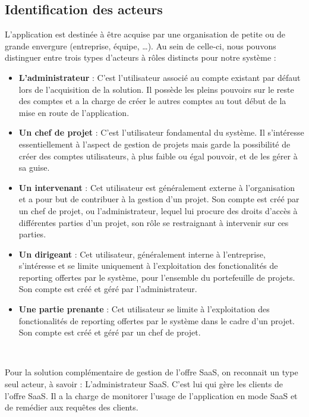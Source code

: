 \begin{spacing}{1.5}
\subsection{Identification des acteurs}
L’application est destinée à être acquise par une organisation de petite ou de grande envergure (entreprise, équipe, …). Au sein de celle-ci, nous pouvons distinguer entre trois types d'acteurs à rôles distincts pour notre système :
\begin{itemize}
    \item \textbf{L'administrateur} : C’est l'utilisateur associé au compte existant par défaut lors de l'acquisition de la solution. Il possède les pleins pouvoirs sur le reste des comptes et a la charge de créer le autres comptes au tout début de la mise en route de l'application.
    \item \textbf{Un chef de projet} : C’est l'utilisateur fondamental du système. Il s'intéresse essentiellement à l'aspect de gestion de projets mais garde la possibilité de créer des comptes utilisateurs, à plus faible ou égal pouvoir, et de les gérer à sa guise.
    \item \textbf{Un intervenant} : Cet utilisateur est généralement externe à l'organisation et a pour but de contribuer à la gestion d'un projet. Son compte est créé par un chef de projet, ou l'administrateur, lequel lui procure des droits d'accès à différentes parties d'un projet, son rôle se restraignant à intervenir sur ces parties.
    \item \textbf{Un dirigeant} : Cet utilisateur, généralement interne à l'entreprise, s'intéresse et se limite uniquement à l'exploitation des fonctionalités de reporting offertes par le système, pour l'ensemble du portefeuille de projets. Son compte est créé et géré par l'administrateur.
    \item \textbf{Une partie prenante} : Cet utilisateur se limite à l'exploitation des fonctionalités de reporting offertes par le système dans le cadre d'un projet. Son compte est créé et géré par un chef de projet.
\end{itemize}
\

Pour la solution complémentaire de gestion de l’offre SaaS, on reconnait un type seul acteur, à savoir : L'administrateur SaaS. C’est lui qui gère les clients de l’offre SaaS. Il a la charge de monitorer l’usage de l’application en mode SaaS et de remédier aux requêtes des clients.


\end{spacing}
